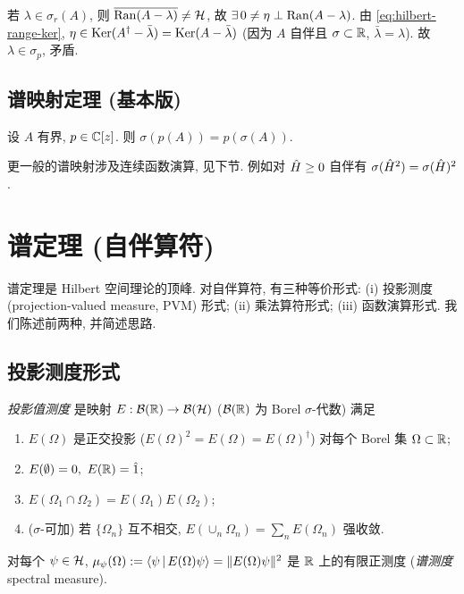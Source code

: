 \begin{proof*}[(2) 的证明]
若 $\lambda\in\sigma_r(A)$, 则 $\overline{\operatorname{Ran}(A-\lambda)}\neq\mathcal{H}$, 故 $\exists\, 0\neq\eta\perp\operatorname{Ran}(A-\lambda)$. 由 \eqref{eq:hilbert-range-ker}, $\eta\in\operatorname{Ker}(A^\dagger-\bar\lambda)=\operatorname{Ker}(A-\bar\lambda)$ (因为 $A$ 自伴且 $\sigma\subset\mathbb{R}$, $\bar\lambda=\lambda$). 故 $\lambda\in\sigma_p$, 矛盾.
\end{proof*}

\subsection{谱映射定理 (基本版)}

\begin{theorem}[多项式谱映射]\label{thm:hilbert-spec-mapping}
设 $A$ 有界, $p\in\mathbb{C}[z]$. 则 $\sigma(p(A))=p(\sigma(A))$.
\end{theorem}

更一般的谱映射涉及连续函数演算, 见下节. 例如对 $\hat{H}\geq 0$ 自伴有 $\sigma(\hat{H}^2)=\sigma(\hat{H})^2$.

\section{谱定理 (自伴算符)}\label{sec:hilbert-spectral-thm}

谱定理是 Hilbert 空间理论的顶峰. 对自伴算符, 有三种等价形式: (i) 投影测度 (projection-valued measure, PVM) 形式; (ii) 乘法算符形式; (iii) 函数演算形式. 我们陈述前两种, 并简述思路.

\subsection{投影测度形式}

\begin{definition}\label{def:hilbert-pvm}
\emph{投影值测度} 是映射 $E:\mathcal{B}(\mathbb{R})\to\mathcal{B}(\mathcal{H})$ ($\mathcal{B}(\mathbb{R})$ 为 Borel $\sigma$-代数) 满足
\begin{enumerate}
    \item $E(\Omega)$ 是正交投影 ($E(\Omega)^2=E(\Omega)=E(\Omega)^\dagger$) 对每个 Borel 集 $\Omega\subset\mathbb{R}$;
    \item $E(\emptyset)=0,\ E(\R)=\Op{1}$;
    \item $E(\Omega_1\cap\Omega_2)=E(\Omega_1)E(\Omega_2)$;
    \item ($\sigma$-可加) 若 $\{\Omega_n\}$ 互不相交, $E(\cup_n\Omega_n)=\sum_n E(\Omega_n)$ 强收敛.
\end{enumerate}
对每个 $\psi\in\mathcal{H}$, $\mu_\psi(\Omega):=\left\langle \psi \,\middle|\, E(\Omega)\psi \right\rangle=\|E(\Omega)\psi\|^2$ 是 $\mathbb{R}$ 上的有限正测度 (\emph{谱测度} spectral measure).
\end{definition}

